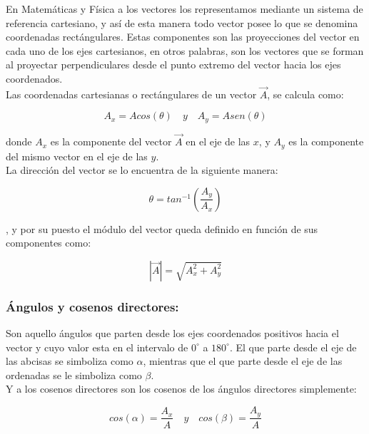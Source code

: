 \documentclass[a5paper,pagesize,10pt,bibtotoc,pointlessnumbers,
normalheadings,DIV=9,fleqn,x11names,table,twoside=false]{scrbook}
\begin{document}
En Matemáticas y Física a los vectores los representamos mediante un sistema de referencia cartesiano, y así de esta 
manera todo vector posee lo que se denomina coordenadas rectángulares. Estas componentes son las proyecciones del 
vector en cada uno de los ejes cartesianos, en otros palabras, son los vectores que se forman al proyectar 
perpendiculares desde el punto extremo del vector hacia los ejes coordenados.\\


Las coordenadas cartesianas o rectángulares de un vector $\vec{A}$, se calcula como:

\begin{equation}
A_x = Acos(\theta) \quad y \quad A_y = Asen(\theta) 
\end{equation}

donde $A_x$ es la componente del vector $\vec{A}$ en el eje de las $x$, y $A_y$ es la componente del mismo vector en el 
eje de las $y$.\\

La dirección del vector se lo encuentra de la siguiente manera:

\begin{equation}
 \theta = tan^{-1}(\frac{A_y}{A_x})
\end{equation}

, y por su puesto el módulo del vector queda definido en función de sus componentes como:

\begin{equation}
 |\vec{A}| = \sqrt{A_x^2 + A_y^2}
\end{equation}

\subsubsection{Ángulos y cosenos directores:}

Son aquello ángulos que parten desde los ejes coordenados positivos hacia el vector y cuyo valor esta en el intervalo 
de $0^\circ$ a $180^\circ$. El que parte desde el eje de las abcisas se simboliza como $\alpha$, mientras que el que 
parte desde el eje de las ordenadas se le simboliza como $\beta$.\\

Y a los cosenos directores son los cosenos de los ángulos directores simplemente:

\begin{equation}
 cos(\alpha) =\frac{A_x}{A}  \quad y \quad cos(\beta)=\frac{A_y}{A}
\end{equation}
\end{document}
